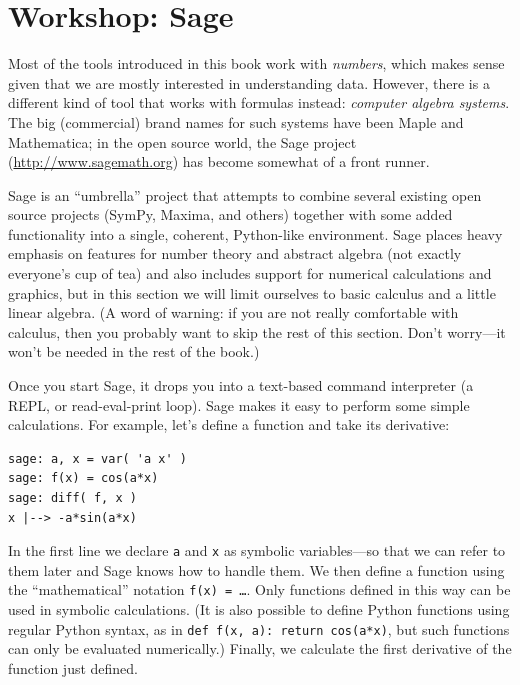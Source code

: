 \section{Workshop: Sage}


Most of the tools introduced in this book work with \emph{numbers},
which makes sense given that we are mostly interested in understanding
data. However, there is a different kind of tool that  works with
formulas instead: \emph{computer algebra systems}. The big
(commercial) brand names for such systems have been Maple and
Mathematica; in the open source world, the Sage project
(\url{http://www.sagemath.org}) has become somewhat of a front runner.

Sage is an ``umbrella'' project that attempts to combine several
existing open source projects (SymPy, Maxima, and others) together
with some added functionality into a single, coherent, Python-like
environment. Sage places heavy emphasis on features for number theory
and abstract algebra (not exactly everyone's cup of tea) and also
includes support for numerical calculations and graphics, but in this
section we will limit ourselves to basic calculus and a little linear
algebra.  (A word of warning: if you are not really comfortable with
calculus, then you probably want to skip the rest of this section.
Don't worry---it won't be needed in the rest of the book.)

Once you start Sage, it drops you into a text-based command
interpreter (a REPL, or read-eval-print loop). Sage makes it easy to
perform some simple calculations. For example, let's define a function
and take its derivative:
\begin{verbatim}
sage: a, x = var( 'a x' )
sage: f(x) = cos(a*x)
sage: diff( f, x )
x |--> -a*sin(a*x)
\end{verbatim}
In the first line we declare \texttt{a} and \texttt{x} as symbolic
variables---so that we can refer to them later and Sage knows how to
handle them. We then define a function using the ``mathematical''
notation \texttt{f(x) = \dots}. Only functions defined in this way can
be used in symbolic calculations. (It is also possible to define
Python functions using regular Python syntax, as in \texttt{def f(x,
  a): return cos(a*x)}, but such functions can only be evaluated
numerically.) Finally, we calculate the first derivative of the
function just defined.

